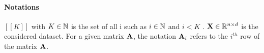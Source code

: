 \paragraph{Notations}

$[\![K]\!]$ with $K \in {\mathbb{N}}$ is the set of all i such as $i \in {\mathbb{N}}$ and $i < K$ . ${\mathbf{X}} \in \mathbb{R}^{n \times d}$ is the considered dataset. For a given matrix ${\mathbf{A}}$, the notation ${\mathbf{A}}_i$ refers to the $i^{th}$ row of the matrix ${\mathbf{A}}$.
